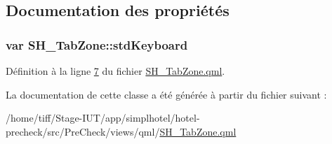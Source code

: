 \subsection{Documentation des propriétés}
\hypertarget{classSH__TabZone_a23223ca4d8158e2f50564d92364f6e14}{
\subsubsection[{std\-Keyboard}]{\setlength{\rightskip}{0pt plus 5cm}var S\-H\-\_\-\-Tab\-Zone\-::std\-Keyboard}}\label{classSH__TabZone_a23223ca4d8158e2f50564d92364f6e14}


Définition à la ligne \hyperlink{SH__TabZone_8qml_source_l00007}{7} du fichier \hyperlink{SH__TabZone_8qml_source}{S\-H\-\_\-\-Tab\-Zone.\-qml}.



La documentation de cette classe a été générée à partir du fichier suivant \-:\begin{DoxyCompactItemize}
\item 
/home/tiff/\-Stage-\/\-I\-U\-T/app/simplhotel/hotel-\/precheck/src/\-Pre\-Check/views/qml/\hyperlink{SH__TabZone_8qml}{S\-H\-\_\-\-Tab\-Zone.\-qml}\end{DoxyCompactItemize}
